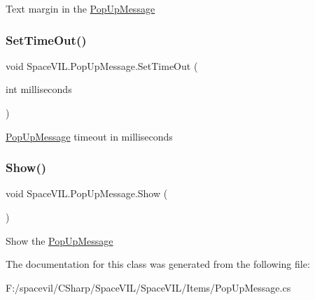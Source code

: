 Text margin in the \mbox{\hyperlink{class_space_v_i_l_1_1_pop_up_message}{Pop\+Up\+Message}} 

\mbox{\label{class_space_v_i_l_1_1_pop_up_message_aed1edbb9ca961585032b46bebd61fbea}} 
\subsubsection{\texorpdfstring{Set\+Time\+Out()}{SetTimeOut()}}
{\footnotesize\ttfamily void Space\+V\+I\+L.\+Pop\+Up\+Message.\+Set\+Time\+Out (\begin{DoxyParamCaption}\item[{int}]{milliseconds }\end{DoxyParamCaption})}



\mbox{\hyperlink{class_space_v_i_l_1_1_pop_up_message}{Pop\+Up\+Message}} timeout in milliseconds 

\mbox{\label{class_space_v_i_l_1_1_pop_up_message_acd66fca578bf2547f983d48650b0f618}} 
\subsubsection{\texorpdfstring{Show()}{Show()}}
{\footnotesize\ttfamily void Space\+V\+I\+L.\+Pop\+Up\+Message.\+Show (\begin{DoxyParamCaption}{ }\end{DoxyParamCaption})}



Show the \mbox{\hyperlink{class_space_v_i_l_1_1_pop_up_message}{Pop\+Up\+Message}} 



The documentation for this class was generated from the following file\+:\begin{DoxyCompactItemize}
\item 
F\+:/spacevil/\+C\+Sharp/\+Space\+V\+I\+L/\+Space\+V\+I\+L/\+Items/Pop\+Up\+Message.\+cs\end{DoxyCompactItemize}

